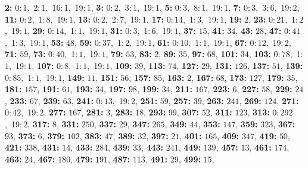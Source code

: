 \textsf{\bfseries 2:} 0:\,$1$,\ 2:\,$1$,\ 16:\,$1$,\ 19:\,$1$, \textsf{\bfseries 3:} 0:\,$2$,\ 3:\,$1$,\ 19:\,$1$, \textsf{\bfseries 5:} 0:\,$3$,\ 8:\,$1$,\ 19:\,$1$, \textsf{\bfseries 7:} 0:\,$3$,\ 3:\,$6$,\ 19:\,$2$, \textsf{\bfseries 11:} 0:\,$2$,\ 1:\,$8$,\ 19:\,$1$, \textsf{\bfseries 13:} 0:\,$2$,\ 2:\,$7$,\ 19:\,$1$, \textsf{\bfseries 17:} 0:\,$14$,\ 1:\,$3$,\ 19:\,$1$, \textsf{\bfseries 19:} $2$, \textsf{\bfseries 23:} 0:\,$21$,\ 1:\,$2$,\ 19:\,$1$, \textsf{\bfseries 29:} 0:\,$14$,\ 1:\,$1$,\ 19:\,$1$, \textsf{\bfseries 31:} 0:\,$3$,\ 1:\,$6$,\ 19:\,$1$, \textsf{\bfseries 37:} $15$, \textsf{\bfseries 41:} $34$, \textsf{\bfseries 43:} $28$, \textsf{\bfseries 47:} 0:\,$41$,\ 1:\,$3$,\ 19:\,$1$, \textsf{\bfseries 53:} $48$, \textsf{\bfseries 59:} 0:\,$37$,\ 1:\,$2$,\ 19:\,$1$, \textsf{\bfseries 61:} 0:\,$10$,\ 1:\,$1$,\ 19:\,$1$, \textsf{\bfseries 67:} 0:\,$12$,\ 19:\,$2$, \textsf{\bfseries 71:} $59$, \textsf{\bfseries 73:} 0:\,$40$,\ 1:\,$1$,\ 19:\,$1$, \textsf{\bfseries 79:} $53$, \textsf{\bfseries 83:} $2$, \textsf{\bfseries 89:} $35$, \textsf{\bfseries 97:} $68$, \textsf{\bfseries 101:} $34$, \textsf{\bfseries 103:} 0:\,$78$,\ 1:\,$1$,\ 19:\,$1$, \textsf{\bfseries 107:} 0:\,$8$,\ 1:\,$1$,\ 19:\,$1$, \textsf{\bfseries 109:} $39$, \textsf{\bfseries 113:} $74$, \textsf{\bfseries 127:} $29$, \textsf{\bfseries 131:} $126$, \textsf{\bfseries 137:} $51$, \textsf{\bfseries 139:} 0:\,$85$,\ 1:\,$1$,\ 19:\,$1$, \textsf{\bfseries 149:} $11$, \textsf{\bfseries 151:} $56$, \textsf{\bfseries 157:} $85$, \textsf{\bfseries 163:} $2$, \textsf{\bfseries 167:} $68$, \textsf{\bfseries 173:} $127$, \textsf{\bfseries 179:} $35$, \textsf{\bfseries 181:} $157$, \textsf{\bfseries 191:} $61$, \textsf{\bfseries 193:} $34$, \textsf{\bfseries 197:} $98$, \textsf{\bfseries 199:} $34$, \textsf{\bfseries 211:} $167$, \textsf{\bfseries 223:} $6$, \textsf{\bfseries 227:} $58$, \textsf{\bfseries 229:} $24$, \textsf{\bfseries 233:} $67$, \textsf{\bfseries 239:} $63$, \textsf{\bfseries 241:} 0:\,$13$,\ 19:\,$2$, \textsf{\bfseries 251:} $59$, \textsf{\bfseries 257:} $39$, \textsf{\bfseries 263:} $241$, \textsf{\bfseries 269:} $124$, \textsf{\bfseries 271:} 0:\,$42$,\ 19:\,$2$, \textsf{\bfseries 277:} $167$, \textsf{\bfseries 281:} $3$, \textsf{\bfseries 283:} $18$, \textsf{\bfseries 293:} $99$, \textsf{\bfseries 307:} $52$, \textsf{\bfseries 311:} $123$, \textsf{\bfseries 313:} 0:\,$292$,\ 19:\,$2$, \textsf{\bfseries 317:} $8$, \textsf{\bfseries 331:} $250$, \textsf{\bfseries 337:} $29$, \textsf{\bfseries 347:} $265$, \textsf{\bfseries 349:} $44$, \textsf{\bfseries 353:} $147$, \textsf{\bfseries 359:} $323$, \textsf{\bfseries 367:} $93$, \textsf{\bfseries 373:} $6$, \textsf{\bfseries 379:} $102$, \textsf{\bfseries 383:} $47$, \textsf{\bfseries 389:} $32$, \textsf{\bfseries 397:} $21$, \textsf{\bfseries 401:} $165$, \textsf{\bfseries 409:} $347$, \textsf{\bfseries 419:} $50$, \textsf{\bfseries 421:} $338$, \textsf{\bfseries 431:} $14$, \textsf{\bfseries 433:} $284$, \textsf{\bfseries 439:} $33$, \textsf{\bfseries 443:} $241$, \textsf{\bfseries 449:} $139$, \textsf{\bfseries 457:} $13$, \textsf{\bfseries 461:} $174$, \textsf{\bfseries 463:} $24$, \textsf{\bfseries 467:} $180$, \textsf{\bfseries 479:} $191$, \textsf{\bfseries 487:} $113$, \textsf{\bfseries 491:} $29$, \textsf{\bfseries 499:} $15$, 